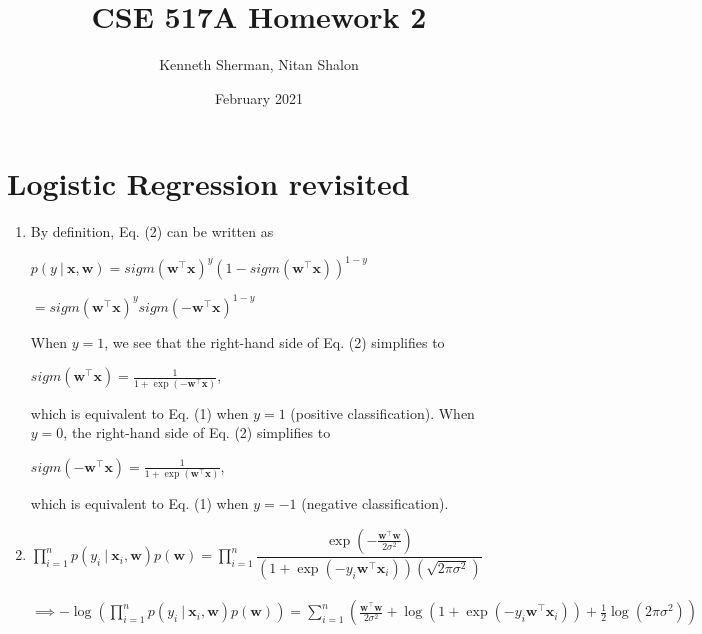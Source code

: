 \documentclass{article}
\title{CSE 517A Homework 2}
\author{Kenneth Sherman, Nitan Shalon}
\date{February 2021}
\begin{document}
\maketitle

\section{Logistic Regression revisited}
\begin{enumerate}[label=(\alph*)]
\item By definition, Eq. (2) can be written as

\begin{center}$p(y\:|\:\mathbf{x}, \mathbf{w}) = 
sigm(\mathbf{w}^\intercal \mathbf{x})^y
(1 - sigm(\mathbf{w}^\intercal \mathbf{x}))^{1-y}$\end{center}

\begin{center}$= sigm(\mathbf{w}^\intercal \mathbf{x})^y
sigm(-\mathbf{w}^\intercal \mathbf{x})^{1-y}$\end{center}

When $y = 1$, we see that the right-hand side of Eq. (2) simplifies to 
\begin{center}$sigm(\mathbf{w}^\intercal \mathbf{x}) = \frac{1}{1 + \exp(-\mathbf{w}^\intercal \mathbf{x})}$, \end{center} 
which is equivalent to Eq. (1) when $y = 1$ (positive classification). When $y = 0$, the right-hand side of Eq. (2) simplifies to 
\begin{center}$sigm(-\mathbf{w}^\intercal \mathbf{x}) = \frac{1}{1 + \exp(\mathbf{w}^\intercal \mathbf{x})}$, \end{center}
which is equivalent to Eq. (1) when $y=-1$ (negative classification).\\

\item $\prod_{i = 1}^{n}p(y_i\:|\:\mathbf{x}_i,\mathbf{w})p(\mathbf{w})
= \prod_{i = 1}^{n}
\dfrac
{\exp(-\frac{\mathbf{w}^\intercal \mathbf{w}}{2\sigma^2})}
{(1 + \exp(-y_i\mathbf{w}^\intercal \mathbf{x}_i))(\sqrt{2\pi\sigma^2})}$ \\\\


$\implies -\log(\prod_{i = 1}^{n}p(y_i\:|\:\mathbf{x}_i,\mathbf{w})p(\mathbf{w})) = 
\sum_{i=1}^{n}( \frac{\mathbf{w}^\intercal\mathbf{w}}{2\sigma^2}
+ \log(1 + \exp(-y_i\mathbf{w}^\intercal \mathbf{x}_i))
+ \frac{1}{2}\log(2\pi\sigma^2))$ \\


\end{enumerate}
\end{document}
